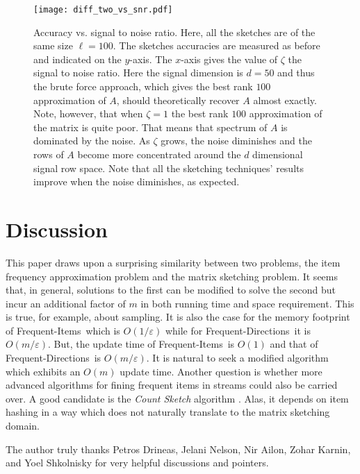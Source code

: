 \documentclass[]{article}
\newcommand{\eps}{\varepsilon}
\newcommand{\FI}{Frequent-Items}
\newcommand{\FD}{Frequent-Directions}
\newcommand{\myfigurewidth}{0.7}
\begin{document}
\begin{figure}[htbp]
\begin{center}
\texttt{[image: diff\_two\_vs\_snr.pdf]}
\caption{Accuracy vs. signal to noise ratio. Here, all the sketches are of the same size $\ell=100$.
The sketches accuracies are measured as before and indicated on the $y$-axis. 
The $x$-axis gives the value of $\zeta$ the signal to noise ratio.
Here the signal dimension is $d=50$ and thus the brute force approach, 
which gives the best rank $100$ approximation of $A$, should theoretically recover $A$ almost exactly.
Note, however, that when $\zeta=1$ the best rank $100$ approximation of the matrix is quite poor.
That means that spectrum of $A$ is dominated by the noise. 
As $\zeta$ grows, the noise diminishes and the rows of $A$ become more concentrated around the $d$ dimensional signal row space.
Note that all the sketching techniques' results improve when the noise diminishes, as expected.  
}
\label{diff_two_vs_snr}
\end{center}
\end{figure}


\section{Discussion}
This paper draws upon a surprising similarity between two problems, the item frequency approximation problem and the matrix sketching problem.
It seems that, in general, solutions to the first can be modified to solve the second but incur 
an additional factor of $m$ in both running time and space requirement. 
This is true, for example, about sampling.
It is also the case for the memory footprint of \FI~which is $O(1/\eps)$ while for \FD~it is $O(m/\eps)$. 
But, the update time of \FI~is $O(1)$ and that of \FD~is $O(m/\eps)$. 
It is natural to seek a modified algorithm which exhibits an $O(m)$ update time.
Another question is whether more advanced algorithms for fining frequent items in streams could also be carried over.
A good candidate is the {\it Count Sketch} algorithm \cite{Charikar2002}. 
Alas, it depends on item hashing in a way which does not naturally translate to the matrix sketching domain.


\vspace{.5cm}
 The author truly thanks Petros Drineas, Jelani Nelson, Nir Ailon, Zohar Karnin, and Yoel Shkolnisky for very helpful discussions and pointers.
 
\pagebreak


\end{document}
